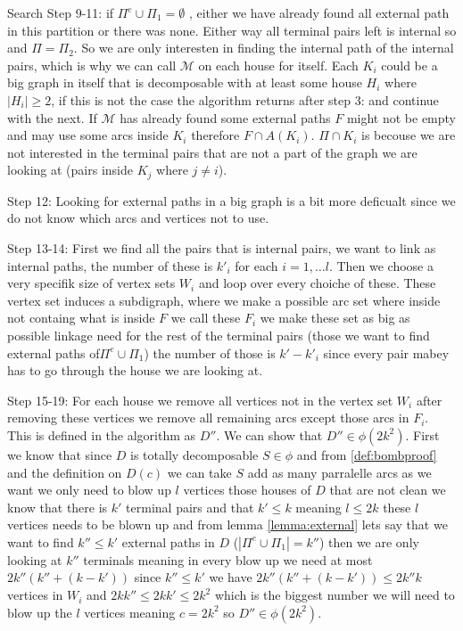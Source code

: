 \documentclass{beamer}
\begin{document}
\begin{frame}[allowframebreaks]{Search}
    Step 9-11: if $\Pi^e\cup \Pi_1=\emptyset$ , either we have already found all external path in this partition or there was none. 
    Either way all terminal pairs left is internal so and $\Pi =\Pi_2$. So we are only interesten in finding the internal path of the internal pairs, which is why we can call $\mathcal{M}$ on each house for itself.
    Each $K_i$ could be a big graph in itself that is decomposable with at least some house $H_i$ where $|H_i|\geq 2$, if this is not the case the algorithm returns after step 3: and continue with the next. 
    If $\mathcal{M}$ has already found some external paths $F$ might not be empty  and may use some arcs inside $K_i$ therefore $F\cap A(K_i)$. $\Pi \cap K_i$ is becouse we are not interested in the terminal pairs that are not a part of the graph we are looking at (pairs inside $K_j$ where $j\neq i$).

    Step 12: Looking for external paths in a big graph is a bit more deficualt since we do not know which arcs and vertices not to use.
    
    Step 13-14: First we find all the pairs that is internal pairs, we want to link as internal paths, the number of these is $k'_i$ for each $i=1,\dots l$. Then we choose a very specifik size of vertex sets $W_i$ and loop over every choiche of these. These vertex set induces a subdigraph, where we make a possible arc set where inside not containg what is inside $F$ we call these $F_i$ we make these set as big as possible linkage need for the rest of the terminal pairs (those we want to find external paths of$\Pi^e\cup \Pi_1$) the number of those is $k'-k'_i$ since every pair mabey has to go through the house we are looking at.
    
    Step 15-19: For each house we remove all vertices not in the vertex set $W_i$ after removing these vertices we remove all remaining arcs except those arcs in $F_i$.
    This is defined in the algorithm as $D''$. We can show that $D''\in \phi(2k^2)$. First we know that since $D$ is totally decomposable $S\in \phi$ and from \autoref{def:bombproof} and the definition on $D(c)$ we can take $S$ add as many parralelle arcs as we want we only need to blow up $l$ vertices those houses of $D$ that are not clean we know that there is $k'$ terminal pairs and that $k'\leq k$ meaning $l\leq 2k$ these $l$ vertices needs to be blown up and from lemma \autoref{lemma:external} lets say that we want to find $k''\leq k'$ external paths in $D$ ($|\Pi^e \cup \Pi_1|=k''$) then we are only looking at $k''$ terminals meaning in every blow up we need at most $2k''(k''+(k-k'))$ since $k''\leq k'$ we have $2k''(k''+(k-k'))\leq 2k''k$ vertices in $W_i$ and $2kk''\leq 2kk'\leq 2k^2$ which is the biggest number we will need to blow up the $l$ vertices meaning $c=2k^2$ so $D''\in \phi (2k^2)$.


\end{frame}
\end{document}
